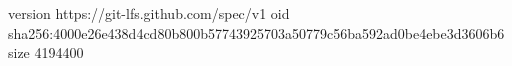 version https://git-lfs.github.com/spec/v1
oid sha256:4000e26e438d4cd80b800b57743925703a50779c56ba592ad0be4ebe3d3606b6
size 4194400
